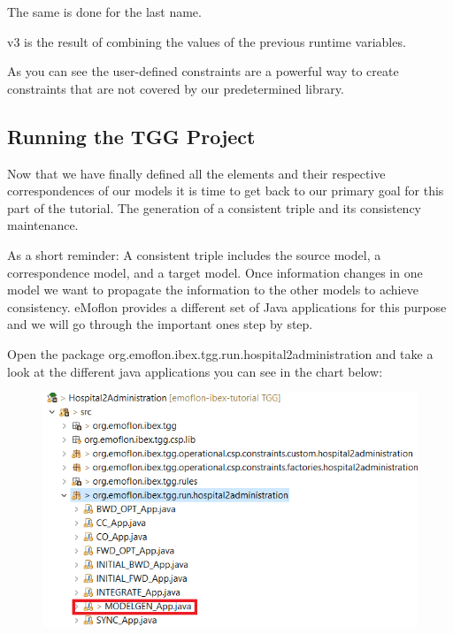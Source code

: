 The same is done for the last name.

\textsf{v3} is the result of combining the values of the previous runtime variables.\newline

As you can see the user-defined constraints are a powerful way to create constraints that are not covered by our predetermined library.

\subsection{Running the TGG Project}

Now that we have finally defined all the elements and their respective correspondences of our models it is time to get back to our primary goal for this part of the tutorial. The generation of a consistent triple and its consistency maintenance.\newline

As a short reminder: A consistent triple includes the source model, a correspondence model, and a target model. Once information changes in one model we want to propagate the information to the other models to achieve consistency. eMoflon provides a different set of Java applications for this purpose and we will go through the important ones step by step. \newline

Open the package \textsf{org.emoflon.ibex.tgg.run.hospital2administration} and take a look at the different java applications you can see in the chart below:

\begin{figure}[h]
    \centering
    \includegraphics[scale=0.65 ]{pictures/modelGENApp.png}
    \caption{}
    \label{setDefaultNumber}
\end{figure}

